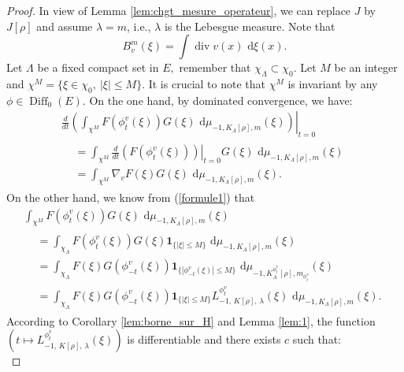 \documentclass[11pt,a4paper]{amsart}
\begin{document}
\begin{proof}
  In view of Lemma \ref{lem:chgt_mesure_operateur}, we can replace $J$
  by $J[\rho]$ and assume $\lambda=m$, i.e., $\lambda$ is the Lebesgue
  measure. Note that
  \begin{equation*}
    B^m_v(\xi)=\int {\operatorname{div}} v(x){\text{ d}}\xi(x).
  \end{equation*}
  Let $\Lambda$ be a fixed compact set in $E,$ remember that
  $\chi_\Lambda\subset \chi_0$. Let $M$ be an integer and
  $\chi^M=\{\xi\in \chi_0,\ |\xi|\le M\}.$ It is crucial to note that
  $\chi^M$ is invariant by any $\phi\in {\operatorname{Diff}}_0(E)$.  On the one hand,
  by dominated convergence, we have:
  \begin{multline*}
    \frac{d}{dt}\left.\left(\int_{\chi^M}F(\phi_t^v(\xi))G(\xi){\text{ d}}\mu_{-1,K_\Lambda[\rho],m}(\xi)\right)\right|_{t=0}\\
    \begin{aligned}
      &=\int_{\chi^M}\left.\frac{d}{dt}\left(F(\phi_t^v(\xi))\right)\right|_{t=0}G(\xi){\text{ d}}\mu_{-1,K_\Lambda[\rho],m}(\xi)\\
      &=\int_{\chi^M}\nabla_v
      F(\xi)G(\xi){\text{ d}}\mu_{-1,K_\Lambda[\rho],m}(\xi).
    \end{aligned}
  \end{multline*}
  On the other hand, we know from (\ref{formule1}) that
  \begin{multline}\label{eq:15}
    \int_{\chi^M}F(\phi_t^v(\xi))G(\xi){\text{ d}}\mu_{-1,K_\Lambda[\rho],m}(\xi)\\
    \begin{aligned}
      &=\int_{\chi_\Lambda}
      F(\phi_t^v(\xi))G(\xi){{\mathbf 1}}_{\{|\xi|\le M\}}{\text{ d}}\mu_{-1,K_\Lambda[\rho],m}(\xi)\\
      &=\int_{\chi_\Lambda} F(\xi)G(\phi_{-t}^v(
      \xi)){{\mathbf 1}}_{\{|\phi_{-t}^v( \xi)|\le M\}}{\text{ d}}
      \mu_{-1,K^{\phi_t^v}_\Lambda[\rho],m_{\phi_t^v}}(\xi)\\
      &=\int_{\chi_\Lambda} F(\xi)G(\phi_{-t}^v( \xi)){{\mathbf 1}}_{\{|
        \xi|\le M\}}L_{-1,\, K[\rho],\,
        \lambda}^{\phi_t^v}(\xi){\text{ d}}\mu_{-1,K_\Lambda[\rho],m}(\xi).
    \end{aligned}
  \end{multline}
  According to Corollary \ref{lem:borne_sur_H} and Lemma \ref{lem:1},
  the function $(t\mapsto L_{-1,\, K[\rho],\, \lambda}^{\phi_t^v}
  (\xi))$ is differentiable and there exists $c$ such that:
  \begin{equation*}

\end{equation*}
\end{proof}
\end{document}
